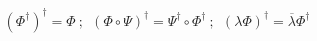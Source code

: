\begin{equation}
	(\Phi^{\dag})^{\dag}=\Phi~;~~(\Phi\circ \Psi)^{\dag}=\Psi^{\dag}\circ \Phi^{\dag}~;~~(\lambda\Phi)^{\dag}=\overline{\lambda}\Phi^{\dag}
\end{equation}

